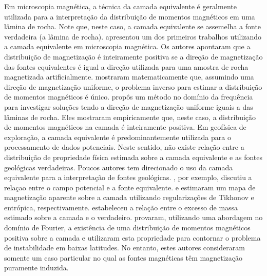 Em microscopia magnética, a técnica da camada equivalente é geralmente utilizada para a interpretação da 
distribuição de momentos magnéticos em uma lâmina de rocha. Note que, neste caso, a camada equivalente se 
assemelha a fonte verdadeira (a lâmina de rocha). \cite{weiss2007} apresentou um dos primeiros trabalhos 
utilizando a camada equivalente em microscopia magnética. Os autores apontaram que a distribuição de magnetização 
é inteiramente positiva se a direção de magnetização das fontes equivalentes é igual a direção utilizada para 
uma amostra de rocha magnetizada artificialmente. \cite{baratchart2013} mostraram matematicamente que, 
assumindo uma direção de magnetização uniforme, o problema inverso para estimar a distribuição de momentos 
magnéticos é único. \cite{lima2013} propôs um método no domínio da frequência para investigar soluções tendo 
a direção de magnetização uniforme iguais a das lâminas de rocha. Eles mostraram empiricamente que, neste caso, 
a distribuição de momentos magnéticos na camada é inteiramente positiva.  Em geofísica de exploração, a 
camada equivalente é predominantemente utilizada para o processamento de dados potenciais. Neste sentido, não 
existe relação entre a distribuição de propriedade física estimada sobre a camada equivalente e as fontes 
geológicas verdadeiras. Poucos autores tem direcionado o uso da camada equivalente para a interpretação de fontes 
geológicas. \cite{pedersen1991}, por exemplo, discutiu a relaçao entre o campo potencial e a fonte equivalente. 
\cite{medeiros_silva1996} e \cite{silva-etal2010} estimaram um mapa de magnetização aparente sobre a camada 
utilizando regularizações de Tikhonov e entrópica, respectivamente. \cite{siqueira_etal_2017} estabeleceu a 
relação entre o excesso de massa estimado sobre a camada e o verdadeiro. \cite{li_etal_2014} provaram, 
utilizando uma abordagem no domínio de Fourier, a existência de uma distribuição de momentos magnéticos positiva 
sobre a camada e utilizaram esta propriedade para contornar o problema de instabilidade em baixas latitudes. 
No entanto, estes autores consideraram somente um caso particular no qual as fontes magnéticas têm 
magnetização puramente induzida. 

